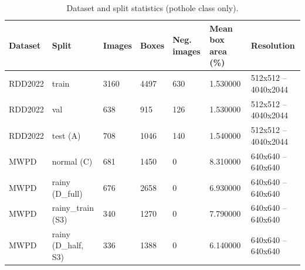 \begin{table}[t]
\caption{Dataset and split statistics (pothole class only).}
\label{tab:tab_dataset_summary}
\begin{tabular}{lllllll}
\toprule
Dataset & Split & Images & Boxes & Neg. images & Mean box area (\%) & Resolution \\
\midrule
RDD2022 & train & 3160 & 4497 & 630 & 1.530000 & 512x512 -- 4040x2044 \\
RDD2022 & val & 638 & 915 & 126 & 1.530000 & 512x512 -- 4040x2044 \\
RDD2022 & test (A) & 708 & 1046 & 140 & 1.540000 & 512x512 -- 4040x2044 \\
MWPD & normal (C) & 681 & 1450 & 0 & 8.310000 & 640x640 -- 640x640 \\
MWPD & rainy (D\_full) & 676 & 2658 & 0 & 6.930000 & 640x640 -- 640x640 \\
MWPD & rainy\_train (S3) & 340 & 1270 & 0 & 7.790000 & 640x640 -- 640x640 \\
MWPD & rainy (D\_half, S3) & 336 & 1388 & 0 & 6.140000 & 640x640 -- 640x640 \\
\bottomrule
\end{tabular}
\end{table}
